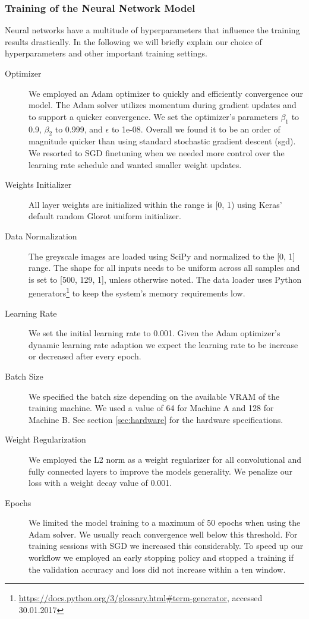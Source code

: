 \subsubsection{Training of the Neural Network Model} 
\label{sec:training}
Neural networks have a multitude of hyperparameters that influence the training results drastically. In the following we will briefly explain our choice of hyperparameters and other important training settings.

	\begin{description}
	\item[Optimizer] We employed an Adam\cite{kingma2014adam} optimizer to quickly and efficiently convergence our model. The Adam solver utilizes momentum during gradient updates and to support a quicker convergence. We set the optimizer's parameters $\beta_1$ to 0.9, $\beta_2$ to 0.999, and $\epsilon$ to 1e-08. Overall we found it to be an order of magnitude quicker than using standard stochastic gradient descent (\ac{sgd}). We resorted to SGD finetuning when we needed more control over the learning rate schedule and wanted smaller weight updates.
	\item[Weights Initializer] All layer weights are initialized within the range is [0, 1) using Keras' default random Glorot uniform initializer\cite{glorot2010understanding}.
	\item[Data Normalization] The greyscale images are loaded using SciPy and normalized to the [0, 1] range. The shape for all inputs needs to be uniform across all samples and is set to [500, 129, 1], unless otherwise noted. The data loader uses Python generators\footnote{\url{https://docs.python.org/3/glossary.html#term-generator}, accessed 30.01.2017} to keep the system's memory requirements low.
	\item[Learning Rate] We set the initial learning rate to 0.001. Given the Adam optimizer's dynamic learning rate adaption we expect the learning rate to be increase or decreased after every epoch. 
	\item[Batch Size] We specified the batch size depending on the available VRAM of the training machine. We used a value of 64 for Machine A and 128 for Machine B. See section \ref{sec:hardware} for the hardware specifications. 
	\item[Weight Regularization] We employed the L2 norm as a weight regularizer for all convolutional and fully connected layers to improve the models generality. We penalize our loss with a weight decay value of 0.001. 
	\item[Epochs] We limited the model training to a maximum of 50 epochs when using the Adam solver. We usually reach convergence well below this threshold. For training sessions with SGD we increased this considerably. To speed up our workflow we employed an early stopping policy and stopped a training if the validation accuracy and loss did not increase within a ten window.

\end{description}
